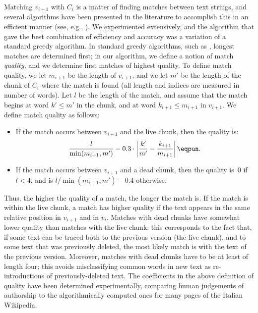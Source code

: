 Matching $v_{i+1}$ with $C_i$ is a matter of finding matches between
text strings, and several algorithms have been presented in the
literature to accomplish this in an efficient manner
(see, e.g.,
\cite{HuntMcIlroy75,Hirchberg77,TichyEditDist,Myers86,BurnsLong97}).
We experimented extensively, and the algorithm that gave the best
combination of efficiency and accuracy was a variation of a standard
greedy algorithm.
In standard greedy algorithms, such as
\cite{Hirchberg77,Myers86,BurnsLong97}, longest matches are determined
first; in our algorithm, we define a notion of match {\em quality,}
and we determine first matches of highest quality.
To define match quality, we let $m_{i+1}$ be the length of $v_{i+1}$,
and we let $m'$ be the length of the chunk of $C_i$ where the match is
found (all length and indices are measured in number of words).
Let $l$ be the length of the match, and assume that the match begins
at word $k' \leq m'$ in the chunk, and at word $k_{i+1} \leq m_{i+1}$
in $v_{i+1}$.
We define match quality as follows:
%
\begin{itemize}
\item If the match occurs between $v_{i+1}$ and the live chunk, then
the quality is:
\[
  \frac{l}{\min(m_{i+1},m')} - 0.3 \cdot \left|
  \frac{k'}{m'} - \frac{k_{i+1}}{m_{i+1}} \right| \eqpun .
\]
\item If the match occurs between $v_{i+1}$ and a dead chunk, then the
quality is~0 if $l < 4$, and is
$
  {l}/{\min(m_{i+1},m')} - 0.4
$ otherwise.
\end{itemize}
%
Thus, the higher the quality of a match, the longer the match is.
If the match is within the live chunk, a match has higher quality if the
text appears in the same relative position in $v_{i+1}$ and in $v_i$.
Matches with dead chunks have somewhat lower quality than matches with
the live chunk: this corresponds to the fact that, if some text can be
traced both to the previous version (the live chunk), and to some
text that was previously deleted, the most likely match is with the
text of the previous version.
Moreover, matches with dead chunks have to be at least of length four;
this avoids misclassifying common words in new text as re-introductions
of previously-deleted text.
The coefficients in the above definition of quality have been
determined experimentally, comparing human judgements of authorship to
the algorithmically computed ones for many pages of the Italian
Wikipedia.



